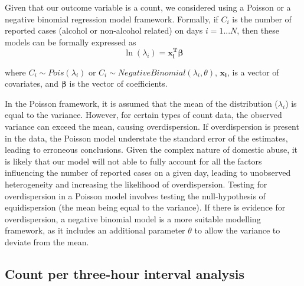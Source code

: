 \documentclass[12pt, a4paper]{article}
\newcommand{\vect}[1]{\boldsymbol{#1}}
\begin{document}
Given that our outcome variable is a count, we considered using a Poisson or a negative binomial regression model framework. 
Formally, if $C_i$ is the number of reported cases (alcohol or non-alcohol related) on days $i = 1...N$, then these models can be formally expressed as
%
\begin{equation}
 \ln(\lambda_i) =\vect{x_i^{T}}\vect{\beta}
\end{equation}


where 
$C_i \sim Pois(\lambda_i)$ or $C_i \sim Negative Binomial(\lambda_i,\theta)$, $\vect{x_i}$, is a vector of covariates, and $\boldsymbol{\beta}$ is the vector of coefficients.

In the Poisson framework, it is assumed that the mean of the distribution ($\lambda_i$) is equal to the variance. 
However, for certain types of count data, the observed variance can exceed the mean, causing overdispersion. 
If overdispersion is present in the data, the Poisson model understate the standard error of the estimates, leading to erroneous conclusions. 
Given the complex nature of domestic abuse, it is likely that our model will not able to fully account for all the factors influencing the number of reported cases on a given day, leading to unobserved heterogeneity and increasing the likelihood of overdispersion. 
Testing for overdispersion in a Poisson model involves testing the null-hypothesis of equidispersion (the mean being equal to the variance).
If there is evidence for overdispersion, a negative binomial model is a more suitable modelling framework, as it includes an additional parameter $\theta$ to allow the variance to deviate from the mean. 


\subsection{Count per three-hour interval analysis}
\end{document}

